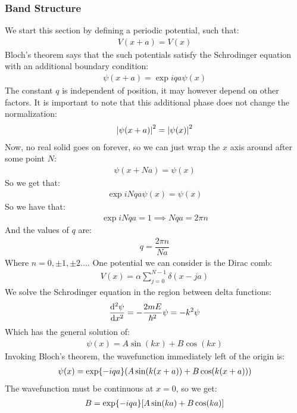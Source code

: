 \subsubsection{Band Structure}
We start this section by defining a periodic potential, such that:
\begin{align*}
  V(x+a)=V(x)
\end{align*}
Bloch's theorem says that the such potentials satisfy the Schrodinger equation with an additional boundary condition:
\begin{align*}
  \psi(x+a)=\exp{iqa}\psi(x)
\end{align*}
The constant $q$ is independent of position, it may however depend on other factors. It is important to note that this additional phase does not change the normalization:
\begin{align*}
  \abs{\psi(x+a)}^2=\abs{\psi(x)}^2
\end{align*}
Now, no real solid goes on forever, so we can just wrap the $x$ axis around after some point $N$:
\begin{align*}
  \psi(x+Na)=\psi(x)
\end{align*}
So we get that:
\begin{align*}
  \exp{iNqa}\psi(x)=\psi(x)
\end{align*}
So we have that:
\begin{align*}
  \exp{iNqa}=1\implies Nqa=2\pi n
\end{align*}
And the values of $q$ are:
\begin{align*}
  q=\dfrac{2\pi n}{Na}
\end{align*}
Where $n =0,\pm1,\pm2...$. One potential we can consider is the Dirac comb:
\begin{align*}
  V(x)=\alpha\sum_{j=0}^{N-1}\delta(x-ja)
\end{align*}
We solve the Schrodinger equation in the region between delta functions:
\begin{align*}
  \dv[2]{\psi}{x}=-\dfrac{2mE}{\hbar^2}\psi=-k^2\psi
\end{align*}
Which has the general solution of:
\begin{align*}
  \psi(x)=A\sin(kx)+B\cos(kx)
\end{align*}
Invoking Bloch's theorem, the wavefunction immediately left of the origin is:
\begin{align*}
  \psi(x)=\exp{-iqa}\qty(A\sin(k(x+a))+B\cos(k(x+a)))
\end{align*}
The wavefunction must be continuous at $x=0$, so we get:
\begin{align*}
  B=\exp{-iqa}\qty[A\sin(ka)+B\cos(ka)]
\end{align*}
